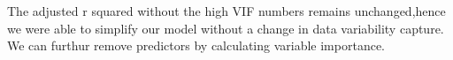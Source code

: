\documentclass[]{report}
\newenvironment{Shaded}{\begin{snugshade}}{\end{snugshade}}
\newcommand{\DataTypeTok}[1]{\textcolor[rgb]{0.13,0.29,0.53}{#1}}
\newcommand{\KeywordTok}[1]{\textcolor[rgb]{0.13,0.29,0.53}{\textbf{#1}}}
\newcommand{\NormalTok}[1]{#1}
\newcommand{\OperatorTok}[1]{\textcolor[rgb]{0.81,0.36,0.00}{\textbf{#1}}}
\newcommand{\OtherTok}[1]{\textcolor[rgb]{0.56,0.35,0.01}{#1}}
\newcommand{\StringTok}[1]{\textcolor[rgb]{0.31,0.60,0.02}{#1}}
\begin{document}
The adjusted r squared without the high VIF numbers remains
unchanged,hence we were able to simplify our model without a change in
data variability capture. We can furthur remove predictors by
calculating variable importance.

\begin{Shaded}
\end{Shaded}
\end{document}
